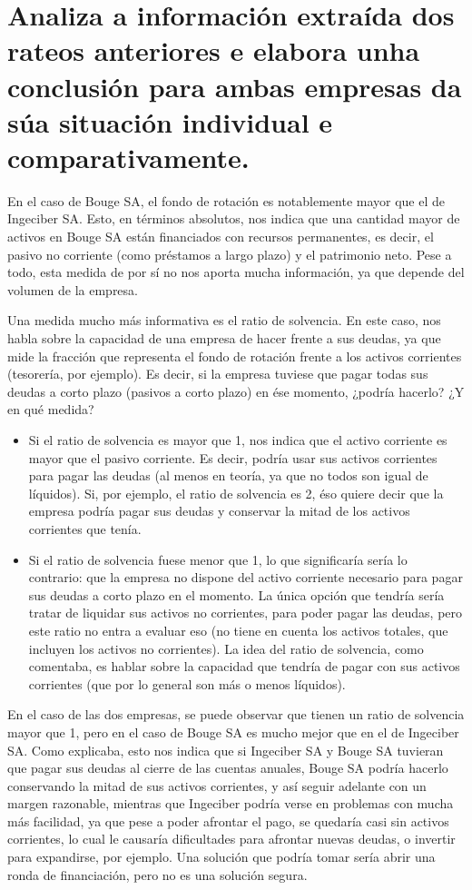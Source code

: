 \documentclass[a4paper]{article}
\begin{document}
\section{Analiza a información extraída dos rateos anteriores e elabora unha conclusión para ambas empresas da súa situación individual e comparativamente.}

En el caso de Bouge SA, el fondo de rotación es notablemente mayor que el de Ingeciber SA. Esto, en términos absolutos, nos indica que una cantidad mayor de activos en Bouge SA están financiados con recursos permanentes, es decir, el pasivo no corriente (como préstamos a largo plazo) y el patrimonio neto. Pese a todo, esta medida de por sí no nos aporta mucha información, ya que depende del volumen de la empresa.

Una medida mucho más informativa es el ratio de solvencia. En este caso, nos habla sobre la capacidad de una empresa de hacer frente a sus deudas, ya que mide la fracción que representa el fondo de rotación frente a los activos corrientes (tesorería, por ejemplo). Es decir, si la empresa tuviese que pagar todas sus deudas a corto plazo (pasivos a corto plazo) en ése momento, ¿podría hacerlo? ¿Y en qué medida?

\begin{itemize}
    \item Si el ratio de solvencia es mayor que 1, nos indica que el activo corriente es mayor que el pasivo corriente. Es decir, podría usar sus activos corrientes para pagar las deudas (al menos en teoría, ya que no todos son igual de líquidos). Si, por ejemplo, el ratio de solvencia es 2, éso quiere decir que la empresa podría pagar sus deudas y conservar la mitad de los activos corrientes que tenía.
    \item Si el ratio de solvencia fuese menor que 1, lo que significaría sería lo contrario: que la empresa no dispone del activo corriente necesario para pagar sus deudas a corto plazo en el momento. La única opción que tendría sería tratar de liquidar sus activos no corrientes, para poder pagar las deudas, pero este ratio no entra a evaluar eso (no tiene en cuenta los activos totales, que incluyen los activos no corrientes). La idea del ratio de solvencia, como comentaba, es hablar sobre la capacidad que tendría de pagar con sus activos corrientes (que por lo general son más o menos líquidos).
\end{itemize}

En el caso de las dos empresas, se puede observar que tienen un ratio de solvencia mayor que 1, pero en el caso de Bouge SA es mucho mejor que en el de Ingeciber SA. Como explicaba, esto nos indica que si Ingeciber SA y Bouge SA tuvieran que pagar sus deudas al cierre de las cuentas anuales, Bouge SA podría hacerlo conservando la mitad de sus activos corrientes, y así seguir adelante con un margen razonable, mientras que Ingeciber podría verse en problemas con mucha más facilidad, ya que pese a poder afrontar el pago, se quedaría casi sin activos corrientes, lo cual le causaría dificultades para afrontar nuevas deudas, o invertir para expandirse, por ejemplo. Una solución que podría tomar sería abrir una ronda de financiación, pero no es una solución segura.
\end{document}
